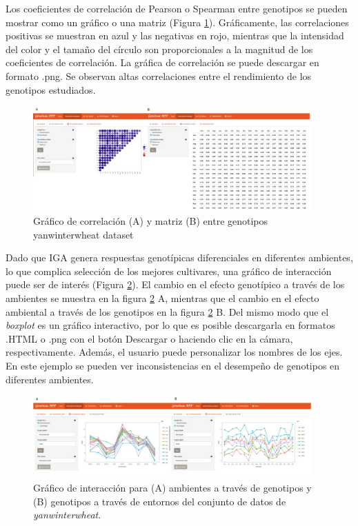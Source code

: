 Los coeficientes de correlación de Pearson o Spearman entre genotipos se pueden mostrar como un gráfico o una matriz (Figura \ref{fig:figdesc2}). Gráficamente, las correlaciones positivas se muestran en azul y las negativas en rojo, mientras que la intensidad del color y el tamaño del círculo son proporcionales a la magnitud de los coeficientes de correlación. La gráfica de correlación se puede descargar en formato .png. Se observan altas correlaciones entre el rendimiento de los genotipos estudiados. 

\begin{figure}[H]
	\begin{center}
		\includegraphics[width=0.95\textwidth]{./Graficos/correlacion.jpg}
	\end{center}
	\caption{Gráfico de correlación (A) y matriz (B) entre genotipos yanwinterwheat dataset }
	\label{fig:figdesc2}
\end{figure}


Dado que IGA genera respuestas genotípicas diferenciales en diferentes ambientes, lo que complica selección de los mejores cultivares, una gráfico de interacción puede ser de interés (Figura \ref{fig:figdesc3}). El cambio en el efecto genotípico a través de los ambientes se muestra en la figura \ref{fig:figdesc3} A, mientras que el cambio en el efecto ambiental a través de los genotipos en la figura \ref{fig:figdesc3} B. Del mismo modo que el \emph{boxplot} es un gráfico interactivo, por lo que es posible descargarla en formatos .HTML o .png con el botón Descargar o haciendo clic en la cámara, respectivamente. Además, el usuario puede personalizar los nombres de los ejes. En este ejemplo se pueden ver inconsistencias en el desempeño de genotipos en diferentes ambientes. 


\begin{figure}[H]
	\begin{center}
		\includegraphics[width=0.95\textwidth]{./Graficos/interaction.jpg}
	\end{center}
	\caption{Gráfico de interacción para (A) ambientes a través de genotipos y (B) genotipos a través de entornos del conjunto de datos de \emph{yanwinterwheat}.}
	\label{fig:figdesc3}
\end{figure}


